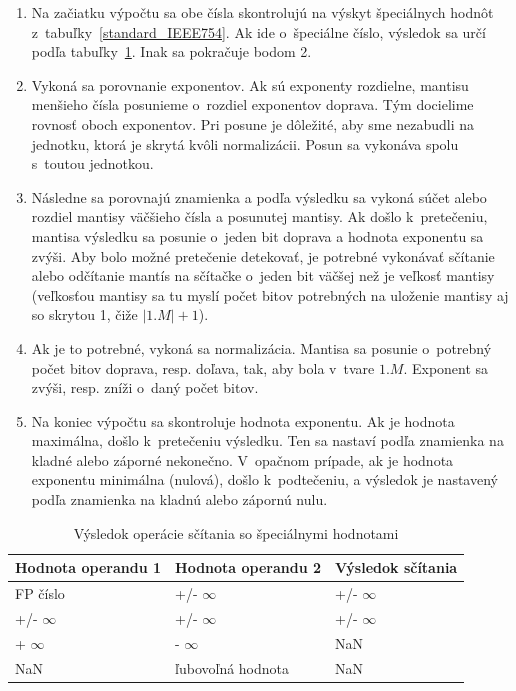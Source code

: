 \begin{enumerate}  
\item Na začiatku výpočtu sa obe čísla skontrolujú na výskyt špeciálnych hodnôt z~tabuľky~\ref{standard_IEEE754}. Ak ide o~špeciálne číslo, výsledok sa určí podľa tabuľky~\ref{special_plus}. Inak sa pokračuje bodom 2.

\item Vykoná sa porovnanie exponentov. Ak sú exponenty rozdielne, mantisu menšieho čísla posunieme o~rozdiel exponentov doprava. Tým docielime rovnosť oboch exponentov. Pri posune je dôležité, aby sme nezabudli na jednotku, ktorá je skrytá kvôli normalizácii. Posun sa vykonáva spolu s~toutou jednotkou. 

\item Následne sa porovnajú znamienka a podľa výsledku sa vykoná súčet alebo rozdiel mantisy väčšieho čísla a posunutej mantisy. Ak došlo k~pretečeniu, mantisa výsledku sa posunie o~jeden bit doprava a hodnota exponentu sa zvýši. Aby bolo možné pretečenie detekovať, je potrebné vykonávať sčítanie alebo odčítanie mantís na sčítačke o~jeden bit väčšej než je veľkosť mantisy (veľkosťou mantisy sa tu myslí počet bitov potrebných na uloženie mantisy aj so skrytou 1, čiže $ |1.M| + 1 $).

\item Ak je to potrebné, vykoná sa normalizácia. Mantisa sa posunie o~potrebný počet bitov doprava, resp. doľava, tak, aby bola v~tvare $ 1.M $. Exponent sa zvýši, resp. zníži o~daný počet bitov.

\item Na koniec výpočtu sa skontroluje hodnota exponentu. Ak je hodnota maximálna, došlo k~pretečeniu výsledku. Ten sa nastaví podľa znamienka na kladné alebo záporné nekonečno. V~opačnom prípade, ak je hodnota exponentu minimálna (nulová), došlo k~podtečeniu, a výsledok je nastavený podľa znamienka na kladnú alebo zápornú nulu.
\end{enumerate}


\begin{table}[h]
\centering
\begin{tabular}{|l|l|l|}
\hline
\rowcolor[HTML]{C0C0C0} 
Hodnota operandu 1 & Hodnota operandu 2 & Výsledok sčítania \\ \hline
FP číslo           & +/- $ \infty $     & +/- $ \infty $    \\ \hline
+/- $ \infty $     & +/- $ \infty $     & +/- $ \infty $    \\ \hline
+ $ \infty $       & - $ \infty $       & NaN               \\ \hline
NaN                & ľubovoľná hodnota  & NaN               \\ \hline
\end{tabular}
\caption{Výsledok operácie sčítania so špeciálnymi hodnotami}
\label{special_plus}
\end{table}

